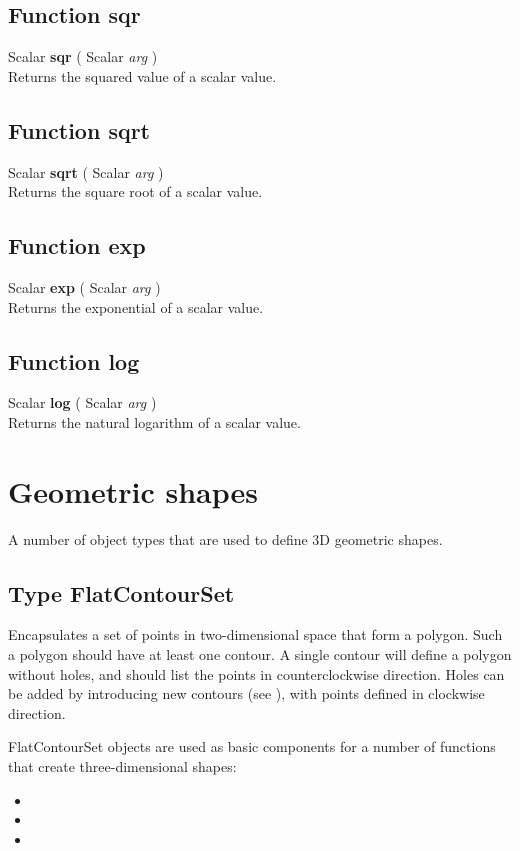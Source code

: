 \subsection{Function sqr \label{F:sqr}}
Scalar \textbf{sqr} ( Scalar \textit{arg} ) \\
Returns the squared value of a scalar value.

\subsection{Function sqrt \label{F:sqrt}}
Scalar \textbf{sqrt} ( Scalar \textit{arg} ) \\
Returns the square root of a scalar value.

\subsection{Function exp \label{F:exp}}
Scalar \textbf{exp} ( Scalar \textit{arg} ) \\
Returns the exponential of a scalar value.

\subsection{Function log \label{F:log}}
Scalar \textbf{log} ( Scalar \textit{arg} ) \\
Returns the natural logarithm of a scalar value.

\section{Geometric shapes \label{Geometric shapes}}
A number of object types that are used to define 3D geometric shapes.

\subsection{Type FlatContourSet \label{T:FlatContourSet}}
Encapsulates a set of points in two-dimensional space that form a polygon. Such a polygon should have at least one contour. A single contour will define a polygon without holes, and should list the points in counterclockwise direction. Holes can be added by introducing new contours (see ), with points defined in clockwise direction.


FlatContourSet objects are used as basic components for a number of functions that create three-dimensional shapes:
\begin{itemize}
\item {}
\item {}
\item {}
\end{itemize}


